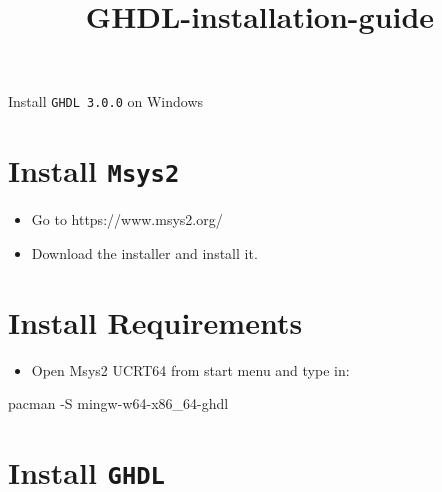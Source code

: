 \documentclass[11pt]{article}
\title{GHDL-installation-guide}
\providecommand{\tightlist}{%
      \setlength{\itemsep}{0pt}\setlength{\parskip}{0pt}}
\newenvironment{Shaded}{}{}
\newcommand{\NormalTok}[1]{{#1}}
\newcommand{\ExtensionTok}[1]{{#1}}
\begin{document}
    
    \maketitle
    
    

    
    \hypertarget{install-ghdl-3.0.0-on-windows}{%
{\Huge \texorpdfstring{Install \texttt{GHDL\ 3.0.0} on
Windows}{Install GHDL 3.0.0 on Windows}}\label{install-ghdl-3.0.0-on-windows}}

    \hypertarget{install-msys2}{%
\section{\texorpdfstring{Install
\texttt{Msys2}}{Install Msys2}}\label{install-msys2}}

\begin{itemize}
\tightlist
\item
  Go to https://www.msys2.org/
\item
  Download the installer and install it.
\end{itemize}

    \hypertarget{install-requirements}{%
\section{Install Requirements}\label{install-requirements}}

\begin{itemize}
\tightlist
\item
  Open Msys2 UCRT64 from start menu and type in:
\end{itemize}

\begin{Shaded}
\begin{Highlighting}[]
\ExtensionTok{pacman}\NormalTok{ {-}S mingw{-}w64{-}x86\_64{-}ghdl}
\end{Highlighting}
\end{Shaded}

    \hypertarget{install-ghdl}{%
\section{\texorpdfstring{Install
\texttt{GHDL}}{Install GHDL}}\label{install-ghdl}}
\end{document}
